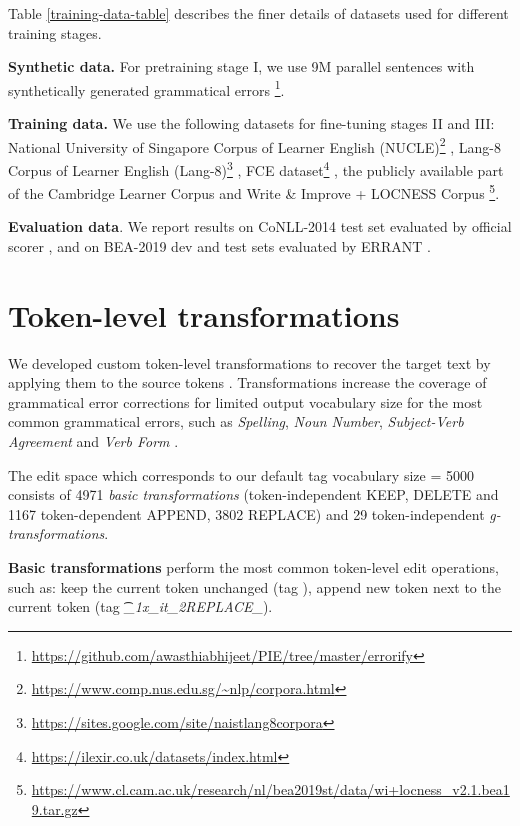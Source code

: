 \documentclass[11pt,a4paper]{article}
\begin{document}
Table \ref{training-data-table} describes the finer details of datasets used for different training stages.

\textbf{Synthetic data.} For pretraining stage I, we use 9M parallel sentences with synthetically generated grammatical errors \cite{awasthi-etal-2019-parallel}\footnote{\url{https://github.com/awasthiabhijeet/PIE/tree/master/errorify}}.

\textbf{Training data.} We use the following datasets for fine-tuning stages II and III: National University of Singapore Corpus of Learner English (NUCLE)\footnote{\url{https://www.comp.nus.edu.sg/~nlp/corpora.html}} \cite{dahlmeier2013building}, Lang-8 Corpus of Learner English (Lang-8)\footnote{\url{https://sites.google.com/site/naistlang8corpora}} \cite{tajiri2012tense}, FCE dataset\footnote{\url{https://ilexir.co.uk/datasets/index.html}} \cite{yannakoudakis2011new}, the publicly available part of the Cambridge Learner Corpus \cite{nicholls2003cambridge} and Write \& Improve + LOCNESS Corpus \cite{bryant2019bea}\footnote{\url{https://www.cl.cam.ac.uk/research/nl/bea2019st/data/wi+locness_v2.1.bea19.tar.gz}}.

\textbf{Evaluation data}. We report results on CoNLL-2014 test set \cite{ng2014CoNLL} evaluated by official  scorer \cite{dahlmeier2012better}, and on BEA-2019 dev and test sets evaluated by ERRANT \cite{bryant2017automatic}. 

\section{Token-level transformations}
\label{section:transformations}

We developed custom token-level transformations  to recover the target text by applying them to the source tokens . Transformations increase the coverage of grammatical error corrections for limited output vocabulary size for the most common grammatical errors, such as \textit{Spelling}, \textit{Noun Number}, \textit{Subject-Verb Agreement} and \textit{Verb Form} \cite[p. 28]{yuan2017grammatical}. 

The edit space which corresponds to our default tag vocabulary size = 5000 consists of 4971 \textit{basic transformations} (token-independent KEEP, DELETE and 1167 token-dependent APPEND, 3802 REPLACE) and 29 token-independent \textit{g-transformations}.

\textbf{Basic transformations} perform the most common token-level edit operations, such as: keep the current token unchanged (tag \textit{\DELETE}), append new token  next to the current token  (tag \textit{\t_{1}x_it_{2}REPLACE\_}).
\end{document}

